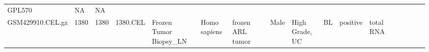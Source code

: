 \documentclass[]{article}
\begin{document}
\begin{longtable}[]{@{}lllllllrllllllllll@{}}
\begin{minipage}[t]{0.01\columnwidth}
GPL570\strut
\end{minipage} & \begin{minipage}[t]{0.00\columnwidth}\raggedright
NA\strut
\end{minipage} & \begin{minipage}[t]{0.01\columnwidth}\raggedright
NA\strut
\end{minipage}\tabularnewline
\begin{minipage}[t]{0.03\columnwidth}\raggedright
GSM429910.CEL.gz\strut
\end{minipage} & \begin{minipage}[t]{0.02\columnwidth}\raggedright
1380\strut
\end{minipage} & \begin{minipage}[t]{0.01\columnwidth}\raggedright
1380\strut
\end{minipage} & \begin{minipage}[t]{0.02\columnwidth}\raggedright
1380.CEL\strut
\end{minipage} & \begin{minipage}[t]{0.06\columnwidth}\raggedright
Frozen Tumor Biopsy\_LN\strut
\end{minipage} & \begin{minipage}[t]{0.02\columnwidth}\raggedright
Homo sapiens\strut
\end{minipage} & \begin{minipage}[t]{0.04\columnwidth}\raggedright
frozen ARL tumor\strut
\end{minipage} & \begin{minipage}[t]{0.05\columnwidth}\raggedleft
32\strut
\end{minipage} & \begin{minipage}[t]{0.04\columnwidth}\raggedright
Male\strut
\end{minipage} & \begin{minipage}[t]{0.06\columnwidth}\raggedright
High Grade, UC\strut
\end{minipage} & \begin{minipage}[t]{0.06\columnwidth}\raggedright
BL\strut
\end{minipage} & \begin{minipage}[t]{0.04\columnwidth}\raggedright
positive\strut
\end{minipage} & \begin{minipage}[t]{0.02\columnwidth}\raggedright
total RNA\strut
\end{minipage} & \begin{minipage}[t]{0.01\columnwidth}\raggedright

\end{minipage}
\end{longtable}
\end{document}

